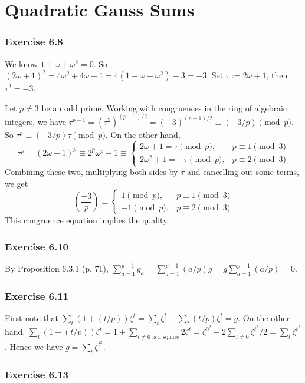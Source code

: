 \documentclass[../I&R.tex]{subfiles}
\begin{document}
\chapter{Quadratic Gauss Sums}

\subsection*{Exercise 6.8}

We know $1+\omega+\omega^2=0$. So $(2\omega+1)^2=4\omega^2+4\omega+1=4(1+\omega+\omega^2)-3=-3$. Set $\tau:=2\omega+1$, then $\tau^2=-3$.

Let $p\neq 3$ be an odd prime. Working with congruences in the ring of algebraic integers, we have $\tau^{p-1}=(\tau^2)^{(p-1)/2}=(-3)^{(p-1)/2}\equiv (-3/p) \pmod{p}$. So $\tau^p\equiv (-3/p)\tau \pmod{p}$. On the other hand,
$$
\tau^p = (2\omega+1)^p \equiv 2^p\omega^p+1 \equiv
\begin{cases}
    2\omega+1 = \tau \pmod{p}, & p\equiv 1\pmod{3} \\
    2\omega^2+1 = -\tau \pmod{p}, & p\equiv 2\pmod{3}
\end{cases}
$$
Combining these two, multiplying both sides by $\tau$ and cancelling out some terms, we get
$$
\left(\dfrac{-3}{p}\right) \equiv
\begin{cases}
    1 \pmod{p}, & p\equiv 1\pmod{3} \\
    -1 \pmod{p}, & p\equiv 2\pmod{3}
\end{cases}
$$
This congruence equation implies the quality.

\subsection*{Exercise 6.10}

By Proposition 6.3.1 (p. 71), $\sum_{a=1}^{p-1} g_a = \sum_{a=1}^{p-1} (a/p)g = g\sum_{a=1}^{p-1} (a/p)=0$.

\subsection*{Exercise 6.11}

First note that $\sum_t (1+(t/p))\zeta^t = \sum_t \zeta^t + \sum_t (t/p)\zeta^t =g$. On the other hand, $\sum_t (1+(t/p))\zeta^t =1 + \sum_{t\neq 0 \text{ is a square}} 2\zeta^t = \zeta^{0^2} + 2\sum_{t\neq 0}\zeta^{t^2}/2 = \sum_t \zeta^{t^2}$. Hence we have $g=\sum_t \zeta^{t^2}$.

\subsection*{Exercise 6.13}
\end{document}

